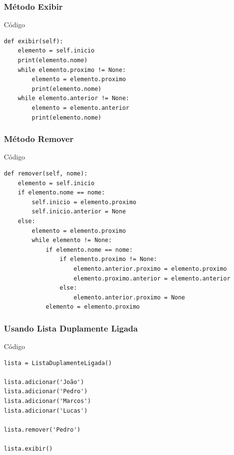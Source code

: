 \documentclass{beamer}
\begin{document}
\begin{frame}[fragile]
\frametitle{Método Exibir}

\begin{exampleblock}{Código}
\begin{lstlisting}
def exibir(self):
    elemento = self.inicio
    print(elemento.nome)
    while elemento.proximo != None:
        elemento = elemento.proximo
        print(elemento.nome)
    while elemento.anterior != None:
        elemento = elemento.anterior
        print(elemento.nome)
\end{lstlisting}
\end{exampleblock}
\end{frame}

\begin{frame}[fragile]
\frametitle{Método Remover}

\begin{exampleblock}{Código}

\begin{lstlisting}
def remover(self, nome):
    elemento = self.inicio
    if elemento.nome == nome:
        self.inicio = elemento.proximo
        self.inicio.anterior = None
    else:
        elemento = elemento.proximo
        while elemento != None:
            if elemento.nome == nome:
                if elemento.proximo != None:
                    elemento.anterior.proximo = elemento.proximo
                    elemento.proximo.anterior = elemento.anterior
                else:
                    elemento.anterior.proximo = None
            elemento = elemento.proximo
\end{lstlisting}

\end{exampleblock}
\end{frame}

\begin{frame}[fragile]
\frametitle{Usando Lista Duplamente Ligada}

\begin{exampleblock}{Código}

\begin{lstlisting}
lista = ListaDuplamenteLigada()

lista.adicionar('João')
lista.adicionar('Pedro')
lista.adicionar('Marcos')
lista.adicionar('Lucas')

lista.remover('Pedro')

lista.exibir()
\end{lstlisting}

\end{exampleblock}
\end{frame}
\end{document}
